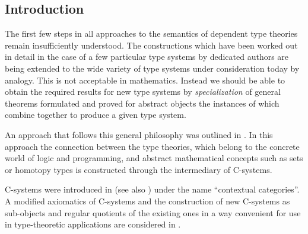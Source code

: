 \documentclass[11pt]{article}
\begin{document}

\tableofcontents

\subsection{Introduction}

The first few steps in all approaches to the semantics of dependent type theories remain insufficiently understood. The constructions which have been worked out in detail in the case of a few particular type systems by dedicated authors are being extended to the wide variety of type systems under consideration today by analogy. This is not acceptable in mathematics. Instead we should be able to obtain the required results for new type systems by {\em specialization} of general theorems formulated and proved for abstract objects the instances of which combine together to produce a given type system. 





An approach that follows this general philosophy was outlined in \cite{CMUtalk}. In this approach the connection between the type theories, which belong to the concrete world of logic and programming, and abstract mathematical concepts such as sets or homotopy types is constructed through the intermediary of C-systems. 

C-systems were introduced in \cite{Cartmell0} (see also \cite{Cartmell1}) under the name ``contextual categories''. A modified axiomatics of C-systems and the construction of new C-systems as sub-objects and regular quotients of the existing ones in a way convenient for use in type-theoretic applications are considered in \cite{Csubsystems}.
\end{document}
